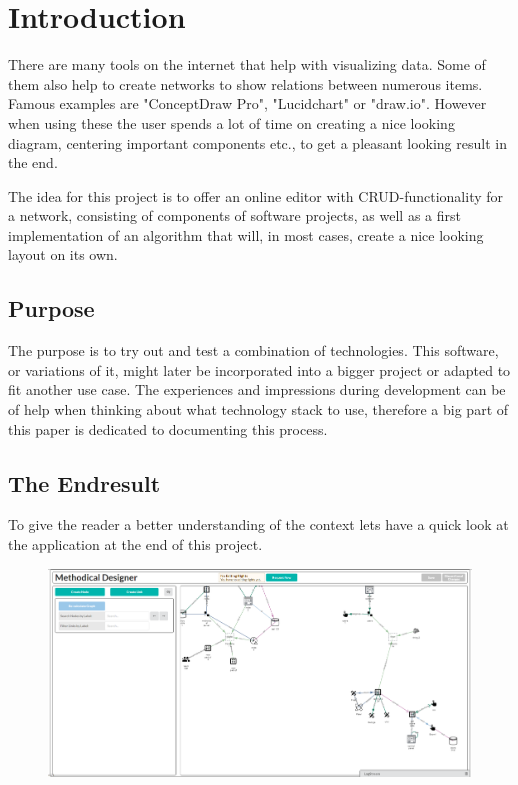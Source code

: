 \chapter{Introduction}
\label{chap:Intro}
There are many tools on the internet that help with visualizing data. Some of them also help to create networks to show relations between numerous items. Famous examples are "ConceptDraw Pro", "Lucidchart" \cite{JeffParker} or "draw.io". However when using these the user spends a lot of time on creating a nice looking diagram, centering important components etc., to get a pleasant looking result in the end.

The idea for this project is to offer an online editor with CRUD-functionality for a network, consisting of components of software projects, as well as a first implementation of an algorithm that will, in most cases, create a nice looking layout on its own.

\section{Purpose}
The purpose is to try out and test a combination of technologies. This software, or variations of it, might later be incorporated into a bigger project or adapted to fit another use case. The experiences and impressions during development can be of help when thinking about what technology stack to use, therefore a big part of this paper is dedicated to documenting this process.

\section{The Endresult}
To give the reader a better understanding of the context lets have a quick look at the application at the end of this project.
\begin{figure}[H]
\centering
\includegraphics[scale=.35]{Bilder/AppOverview.png}
\label{pic:AppOverview}
\end{figure}

